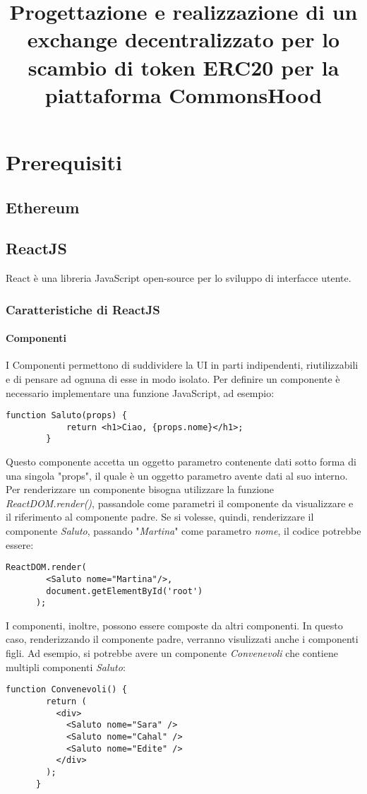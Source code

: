 \documentclass[a4paper]{article}
\title{Progettazione e realizzazione di un exchange decentralizzato per lo scambio di token ERC20 per la piattaforma CommonsHood}
\begin{document}
    \tableofcontents
    \newpage
    \section{Prerequisiti}
    \subsection{Ethereum}
    \subsection{ReactJS}
    React è una libreria JavaScript open-source per lo sviluppo di interfacce utente.
    \subsubsection{Caratteristiche di ReactJS}
    \paragraph{Componenti}
    I Componenti permettono di suddividere la UI in parti indipendenti, riutilizzabili e di pensare ad ognuna di esse in modo isolato.
    Per definire un componente è necessario implementare una funzione JavaScript, ad esempio:

    \begin{lstlisting}[style=ES6, title={Esempio componente}]
        function Saluto(props) {
            return <h1>Ciao, {props.nome}</h1>;
        }\end{lstlisting}

    Questo componente accetta un oggetto parametro contenente dati sotto forma di una singola
    "props", il quale è un oggetto parametro avente dati al suo interno.
    Per renderizzare un componente bisogna utilizzare la funzione \emph{ReactDOM.render()},
    passandole come parametri il componente da visualizzare e il riferimento al componente padre.
    Se si volesse, quindi, renderizzare il componente \emph{Saluto}, passando "\emph{Martina}" come parametro \emph{nome}, il codice potrebbe essere:
    
    \begin{lstlisting}[style=ES6, title={Esempio composizione di componenti}]
      ReactDOM.render(
        <Saluto nome="Martina"/>, 
        document.getElementById('root')
      );\end{lstlisting}
    
    I componenti, inoltre, possono essere composte da altri componenti. In questo caso,
    renderizzando il componente padre, verranno visulizzati anche i componenti figli. Ad esempio, 
    si potrebbe avere un componente \emph{Convenevoli} che contiene multipli componenti \emph{Saluto}:
    \begin{lstlisting}[style=ES6, title={Esempio renderizzazione componente}]
      function Convenevoli() {
        return (
          <div>
            <Saluto nome="Sara" />
            <Saluto nome="Cahal" />
            <Saluto nome="Edite" />
          </div>
        );
      }\end{lstlisting}
\end{document}
